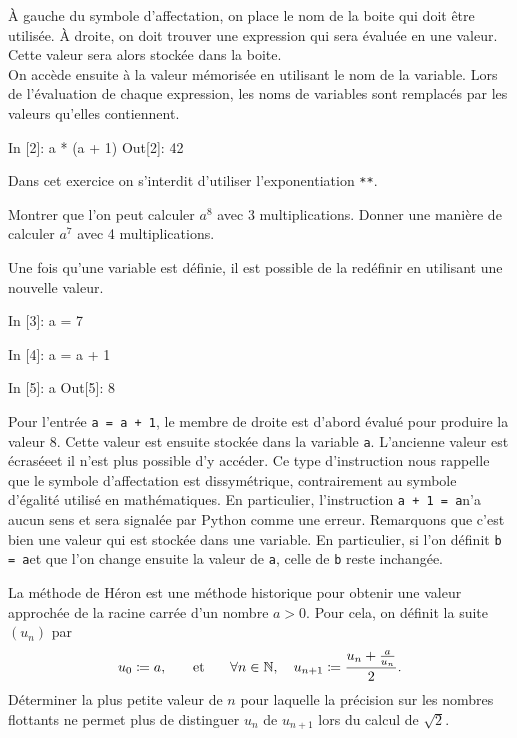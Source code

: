 \documentclass{magnolia}
\begin{document}
\noindent À gauche du symbole d'affectation, on place le nom de la boite qui doit
être utilisée. À droite, on doit trouver une expression qui sera évaluée en une valeur. Cette
valeur sera alors stockée dans la boite.\\

On accède ensuite à la valeur mémorisée en utilisant le nom de la variable. Lors de
l'évaluation de chaque expression, les noms de variables sont remplacés par les valeurs
qu'elles contiennent.

\begin{pythoncode}
In [2]: a * (a + 1)
Out[2]: 42 
\end{pythoncode}



\begin{exoUnique}
\exo Dans cet exercice on s'interdit d'utiliser l'exponentiation \og\verb_**_\fg.
\begin{questions}
\question Montrer que l'on peut calculer $a^8$ avec 3 multiplications.
\question Donner une manière de calculer $a^7$ avec 4 multiplications.
\end{questions}
\end{exoUnique}
\bigskip

Une fois qu'une variable est définie, il est possible de la redéfinir en utilisant une nouvelle valeur.

\begin{pythoncode}
In [3]: a = 7

In [4]: a = a + 1

In [5]: a
Out[5]: 8
\end{pythoncode}

\noindent Pour l'entrée \verb!a = a + 1!, le membre de droite est d'abord évalué pour produire la valeur 8.
Cette valeur est ensuite stockée dans la variable \verb_a_. L'ancienne valeur est \og
écrasée\fg et il n'est plus possible d'y accéder. Ce type d'instruction nous rappelle que le
symbole d'affectation est dissymétrique, contrairement au symbole d'égalité utilisé en
mathématiques. En particulier, l'instruction \og\verb_a + 1 = a_\fg n'a aucun sens et sera
signalée par Python comme une erreur. Remarquons que c'est bien une valeur qui est
stockée dans une variable. En particulier, si l'on définit
\og\verb_b = a_\fg et que l'on change ensuite la valeur de \verb_a_, celle de
\verb_b_ reste inchangée.
\vspace{2ex}
\begin{exoUnique}
\exo La méthode de Héron est une méthode historique pour obtenir une valeur
  approchée de la racine carrée d'un nombre $a>0$. Pour cela, on définit
	la suite $(u_n)$ par
	\[u_0\coloneqq a, \quad\quad\!\text{et}\quad\!\quad \forall n\in\mathbb{N},\quad u_{n+1}\coloneqq\frac{u_n + \frac{a}{u_n}}{2}.\]
	Déterminer la plus petite valeur de $n$ pour laquelle la précision sur les nombres
	flottants ne permet plus de distinguer $u_n$ de $u_{n+1}$ lors du calcul de $\sqrt{2}$.
\end{exoUnique}
\vspace{2ex}
\end{document}
